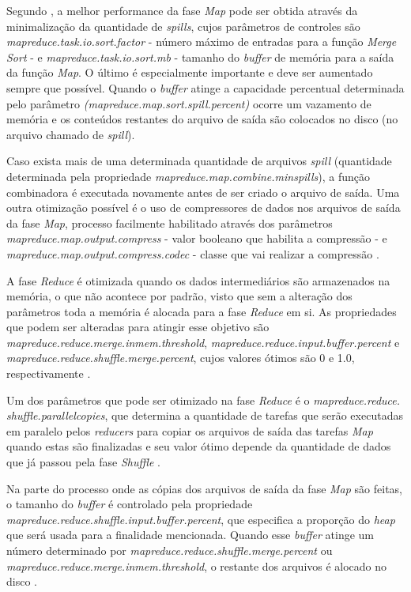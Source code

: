 Segundo \textcite{HadoopBook15}, a melhor performance da fase \textit{Map} pode ser obtida através da minimalização da quantidade de \textit{spills}, cujos parâmetros de controles são \textit{mapreduce.task.io.sort.factor} - número máximo de entradas para a função \textit{Merge Sort} - e \textit{mapreduce.task.io.sort.mb} - tamanho do \textit{buffer} de memória para a saída da função \textit{Map}. O último é especialmente importante e deve ser aumentado sempre que possível. Quando o \textit{buffer} atinge a capacidade percentual determinada pelo parâmetro \textit{(mapreduce.map.sort.spill.percent)} ocorre um vazamento de memória e os conteúdos restantes do arquivo de saída são colocados no disco (no arquivo chamado de \textit{spill}).

Caso exista mais de uma determinada quantidade de arquivos \textit{spill} (quantidade determinada pela propriedade \textit{mapreduce.map.combine.minspills}), a função combinadora é executada novamente antes de ser criado o arquivo de saída. Uma outra otimização possível é o uso de compressores de dados nos arquivos de saída da fase \textit{Map}, processo facilmente habilitado através dos parâmetros \textit{mapreduce.map.output.compress} - valor booleano que habilita a compressão - e \textit{mapreduce.map.output.compress.codec} - classe que vai realizar a compressão \cite{HadoopBook15}.

A fase \textit{Reduce} é otimizada quando os dados intermediários são armazenados na memória, o que não acontece por padrão, visto que sem a alteração dos parâmetros toda a memória é alocada para a fase \textit{Reduce} em si. As propriedades que podem ser alteradas para atingir esse objetivo são \textit{mapreduce.reduce.merge.inmem.threshold}, \textit{mapreduce.reduce.input.buffer.percent} e \textit{mapreduce.reduce.shuffle.merge.percent}, cujos valores ótimos são 0 e 1.0, respectivamente \cite{HadoopBook15}.

Um dos parâmetros que pode ser otimizado na fase \textit{Reduce} é o \textit{mapreduce.reduce. shuffle.parallelcopies}, que determina a quantidade de tarefas que serão executadas em paralelo pelos \textit{reducers} para copiar os arquivos de saída das tarefas \textit{Map} quando estas são finalizadas e seu valor ótimo depende da quantidade de dados que já passou pela fase \textit{Shuffle} \cite{MRONLINELi14}.

Na parte do processo onde as cópias dos arquivos de saída da fase \textit{Map} são feitas, o tamanho do \textit{buffer} é controlado pela propriedade \textit{mapreduce.reduce.shuffle.input.buffer.percent}, que especifica a proporção do \textit{heap} que será usada para a finalidade mencionada. Quando esse \textit{buffer} atinge um número determinado por \textit{mapreduce.reduce.shuffle.merge.percent} ou \textit{mapreduce.reduce.merge.inmem.threshold}, o restante dos arquivos é alocado no disco \cite{HadoopBook15}.

